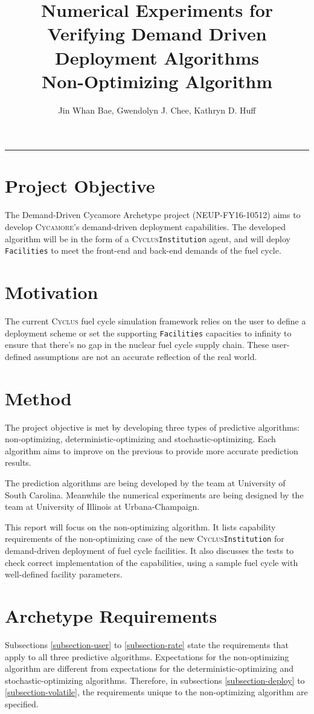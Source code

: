 \documentclass[11pt,letterpaper]{article}
\title{Numerical Experiments for Verifying Demand Driven Deployment Algorithms 
        \\ \vspace{0.5em} Non-Optimizing Algorithm}
\author{Jin Whan Bae, Gwendolyn J. Chee, Kathryn D. Huff}
\newcommand{\Cyclus}{\textsc{Cyclus}\xspace}%
\newcommand{\Cycamore}{\textsc{Cycamore}\xspace}%
\begin{document}
	\maketitle
	\hrule

\section{Project Objective}
The Demand-Driven Cycamore Archetype project (NEUP-FY16-10512) aims to develop \Cycamore's demand-driven deployment capabilities. The developed algorithm will be in the form of a \Cyclus \texttt{Institution} agent, and will deploy \texttt{Facilities} to meet the front-end and back-end demands of the fuel cycle.

\section{Motivation} 
The current \Cyclus fuel cycle simulation framework relies on the user to define
a deployment scheme or set the supporting \texttt{Facilities} capacities to infinity
to ensure that there's no gap in the nuclear fuel cycle supply chain. These user-defined assumptions 
are not an accurate reflection of the real world. 

\section{Method}
The project objective is met by developing three types of predictive algorithms: non-optimizing, deterministic-optimizing and stochastic-optimizing. Each algorithm aims to improve on the previous 
to provide more accurate prediction results.  

The prediction algorithms are being developed by the team at University of South Carolina. Meanwhile the numerical experiments are being designed by the team at University of Illinois at Urbana-Champaign.

This report will focus on the non-optimizing algorithm. 
It lists capability requirements of the non-optimizing case of the new \Cyclus \texttt{Institution}
for demand-driven deployment of fuel cycle facilities. 
It also discusses the tests to check correct implementation of the capabilities,
using a sample fuel cycle with well-defined facility parameters.

\section{Archetype Requirements}
Subsections \ref{subsection-user} to \ref{subsection-rate} state the requirements that apply to all three predictive algorithms. Expectations for the non-optimizing algorithm are different from expectations for the deterministic-optimizing and stochastic-optimizing algorithms. Therefore, in subsections \ref{subsection-deploy} to \ref{subsection-volatile}, the requirements unique to the non-optimizing algorithm are specified. 
\end{document}
